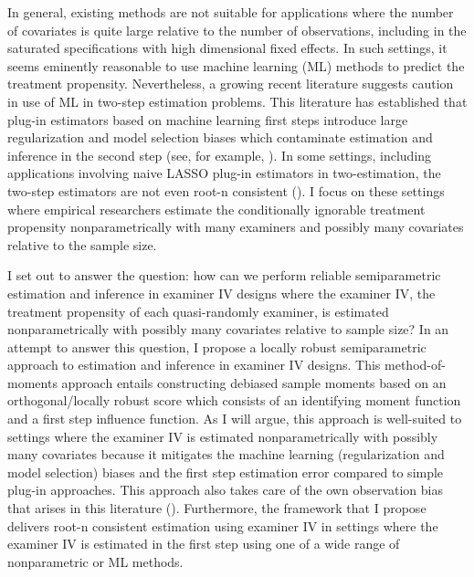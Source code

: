 In general, existing methods are not suitable for applications where the number of covariates is quite large relative to the number of observations, including in the saturated specifications with high dimensional fixed effects. In such settings, it seems eminently reasonable to use machine learning (ML) methods to predict the treatment propensity. Nevertheless, a growing recent literature suggests caution in use of ML in two-step estimation problems. This literature has established that plug-in estimators based on machine learning first steps introduce large regularization and model selection biases which contaminate estimation and inference in the second step (see, for example, \citet{chernozhukov2018double}). In some settings, including applications involving naive LASSO plug-in estimators in two-estimation, the two-step estimators are not even root-n consistent (\citet{chernozhukov2022locally}). I focus on these settings where empirical researchers estimate the conditionally ignorable treatment propensity nonparametrically with many examiners and possibly many covariates relative to the sample size.

I set out to answer the question: how can we perform reliable semiparametric estimation and inference in examiner IV designs where the examiner IV, the treatment propensity of each quasi-randomly examiner, is estimated nonparametrically with possibly many covariates relative to sample size? In an attempt to answer this question, I propose a locally robust semiparametric approach to estimation and inference in examiner IV designs. This method-of-moments approach entails constructing debiased sample moments based on an orthogonal/locally robust score which consists of an identifying moment function and a first step influence function. As I will argue, this approach is well-suited to settings where the examiner IV is estimated nonparametrically with possibly many covariates because it mitigates the machine learning (regularization and model selection) biases and the first step estimation error compared to simple plug-in approaches. This approach also takes care of the own observation bias that arises in this literature (\citet{chernozhukov2022locally}). Furthermore, the framework that I propose delivers root-n consistent estimation using examiner IV in settings where the examiner IV is estimated in the first step using one of a wide range of nonparametric or ML methods. 

